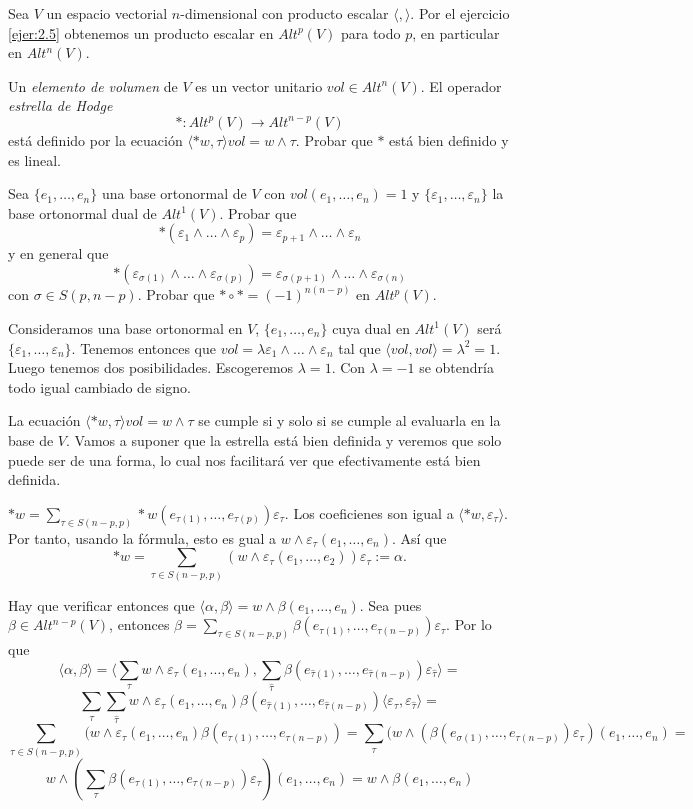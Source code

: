 \documentclass[twoside]{article}
\begin{document}
\begin{ejercicio}{2.9}
Sea $V$ un espacio vectorial $n$-dimensional con producto escalar $\langle,\rangle$. Por el ejercicio \ref{ejer:2.5} obtenemos un producto escalar en $Alt^p(V)$ para todo $p$, en particular en $Alt^n(V)$. 

Un \emph{elemento de volumen} de $V$ es un vector unitario $vol\in Alt^n(V)$. El operador \emph{estrella de Hodge}
\[
*: Alt^p(V)\to Alt^{n-p}(V)
\]  
está definido por la ecuación $\langle *w,\tau\rangle vol=w\land \tau$. Probar que $*$ está bien definido y es lineal.

Sea $\{e_1,\dots, e_n\}$ una base ortonormal de $V$ con $vol(e_1,\dots, e_n)=1$ y $\{\varepsilon_1,\dots, \varepsilon_n\}$ la base ortonormal dual de $Alt^1(V)$. Probar que 
\[
*(\varepsilon_1\land\dots\land\varepsilon_p)=\varepsilon_{p+1}\land\dots\land\varepsilon_n
\]
y en general que
\[
*(\varepsilon_{\sigma(1)}\land\dots\land\varepsilon_{\sigma(p)})=\varepsilon_{\sigma(p+1)}\land\dots\land\varepsilon_{\sigma(n)}
\]
con $\sigma\in S(p,n-p)$. Probar que $*\circ *=(-1)^{n(n-p)}$ en $Alt^p(V)$.
\end{ejercicio}
\begin{solucion}
Consideramos una base ortonormal en $V$, $\{e_1,\dots, e_n\}$ cuya dual en $Alt^1(V)$ será $\{\varepsilon_1,\dots, \varepsilon_n\}$. Tenemos entonces que $vol=\lambda\varepsilon_1\land\dots\land\varepsilon_n$ tal que $\langle vol,vol\rangle=\lambda^2=1$. Luego tenemos dos posibilidades. Escogeremos $\lambda=1$. Con $\lambda=-1$ se obtendría todo igual cambiado de signo.

La ecuación $\langle *w,\tau\rangle vol=w\land \tau$ se cumple si y solo si se cumple al evaluarla en la base de $V$. Vamos a suponer que la estrella está bien definida y veremos que solo puede ser de una forma, lo cual nos facilitará ver que efectivamente está bien definida.

$*w=\sum_{\tau\in S(n-p,p)}*w(e_{\tau(1)},\dots, e_{\tau(p)})\varepsilon_{\tau}$. Los coeficienes son igual a $\langle *w,\varepsilon_{\tau}\rangle$. Por tanto, usando la fórmula, esto es gual a $w\land\varepsilon_{\tau}(e_1,\dots, e_n)$. Así que
\[
*w=\sum_{\tau\in S(n-p,p)}(w\land\varepsilon_{\tau}(e_1,\dots, e_2))\varepsilon_{\tau}:=\alpha.
\]

Hay que verificar entonces que $\langle\alpha,\beta\rangle=w\land\beta(e_1,\dots, e_n)$. Sea pues $\beta\in Alt^{n-p}(V)$, entonces $\beta=\sum_{\tau\in S(n-p,p)}\beta(e_{\tau(1)},\dots, e_{\tau(n-p)})\varepsilon_{\tau}$. Por lo que
\[
\langle \alpha,\beta\rangle=\langle \sum_{\tau} w\land \varepsilon_{\tau}(e_1,\dots, e_n), \sum_{\hat{\tau}}\beta(e_{\hat{\tau}(1)},\dots, e_{\hat{\tau}(n-p)})\varepsilon_{\hat{\tau}}\rangle=
\]
\[
\sum_{\tau}\sum_{\hat{\tau}}w\land\varepsilon_{\tau}(e_1,\dots, e_n)\beta(e_{\hat{\tau}(1)},\dots, e_{\hat{\tau}(n-p)})\langle\varepsilon_{\tau},\varepsilon_{\hat{\tau}}\rangle=
\]
\[
\sum_{\tau\in S(n-p,p)}(w\land\varepsilon_{\tau}(e_1,\dots, e_n)\beta(e_{\tau(1)},\dots, e_{\tau(n-p)})=\sum_{\tau}(w\land(\beta(e_{\sigma(1)},\dots, e_{\tau(n-p)})\varepsilon_{\tau})(e_1,\dots, e_n)=
\]
\[
w\land(\sum_{\tau}\beta(e_{\tau(1)},\dots, e_{\tau(n-p)})\varepsilon_{\tau})(e_1,\dots, e_n)=w\land\beta(e_1,\dots, e_n)
\]
\end{solucion}
\end{document}
